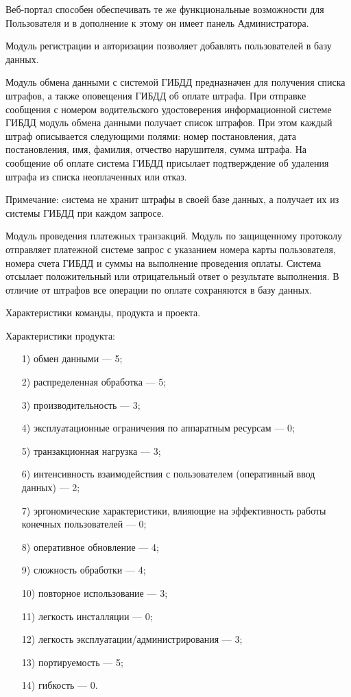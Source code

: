 \documentclass{bmstu}
\begin{document}
Веб-портал способен обеспечивать те же функциональные возможности для Пользователя и в дополнение к этому он имеет панель Администратора.

Модуль регистрации и авторизации позволяет добавлять пользователей в
базу данных.

Модуль обмена данными с системой ГИБДД предназначен для получения списка штрафов, а также оповещения ГИБДД об оплате штрафа. 
При отправке сообщения с номером водительского удостоверения информационной системе ГИБДД модуль обмена данными получает список штрафов. 
При этом каждый штраф описывается следующими полями: номер постановления, дата постановления, имя, фамилия, отчество нарушителя,
сумма штрафа. 
На сообщение об оплате система ГИБДД присылает подтверждение об удаления штрафа из списка неоплаченных или отказ.

Примечание: cистема не хранит штрафы в своей базе данных, а получает их из системы ГИБДД при каждом запросе.

Модуль проведения платежных транзакций. 
Модуль по защищенному протоколу отправляет платежной системе запрос с указанием номера карты пользователя, номера счета ГИБДД и суммы на выполнение проведения оплаты. 
Система отсылает положительный или отрицательный ответ о результате выполнения. 
В отличие от штрафов все операции по оплате сохраняются в базу данных.

Характеристики команды, продукта и проекта.

Характеристики продукта:
\begin{enumerate}
\item[1)] обмен данными --- 5;
\item[2)] распределенная обработка --- 5;
\item[3)] производительность --- 3;
\item[4)] эксплуатационные ограничения по аппаратным ресурсам --- 0;
\item[5)] транзакционная нагрузка --- 3;
\item[6)] интенсивность взаимодействия с пользователем (оперативный ввод данных) --- 2;
\item[7)] эргономические характеристики, влияющие на эффективность работы конечных пользователей --- 0;
\item[8)] оперативное обновление --- 4;
\item[9)] сложность обработки --- 4;
\item[10)] повторное использование --- 3;
\item[11)] легкость инсталляции --- 0;
\item[12)] легкость эксплуатации/администрирования --- 3;
\item[13)] портируемость --- 5;
\item[14)] гибкость --- 0.
\end{enumerate}
\end{document}
